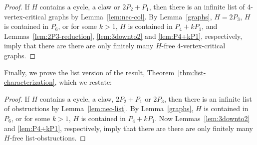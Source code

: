 \documentclass[11pt]{article}
\begin{document}
%
%

\secondthm*

\begin{proof}
If $H$ contains a cycle, a claw or $2P_2+P_1$, then  there is an infinite 
list of 4-vertex-critical graphs by Lemma~\ref{lem:nec-col}. By 
Lemma~\ref{graphs}, 
$H=2P_3$, $H$ is contained in $P_6$, or for some $k>1$, $H$ is contained in
$P_4+kP_1$, and Lemmas~\ref{lem:2P3-reduction}, \ref{lem:3downto2}
and \ref{lem:P4+kP1}, respectively,  imply that there are  there are only finitely many $H$-free $4$-vertex-critical graphs.  
\end{proof}

Finally, we prove  the list version of the result, Theorem~\ref{thm:list-characterization}, which we restate:


\thirdthm*


\begin{proof}
If $H$ contains a cycle, a claw, $2P_2+P_1$ or $2P_3$, then  there is an infinite list of obstructions by Lemma~\ref{lem:nec-list}. By Lemma~\ref{graphs}, 
$H$ is contained in $P_6$, or for some $k>1$, $H$ is contained in
$P_4+kP_1$.  Now Lemmas~\ref{lem:3downto2} and \ref{lem:P4+kP1}, respectively,
imply that there are  there are only finitely many $H$-free list-obstructions.
\end{proof}
\end{document}
